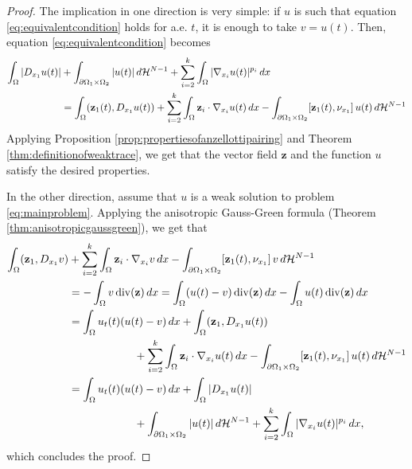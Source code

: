 \documentclass[reqno,12pt]{amsart}
\def\z{{\bf z}}
\numberwithin{equation}{section}
\begin{document}
\begin{proof}
The implication in one direction is very simple: if $u$ is such that equation \eqref{eq:equivalentcondition} holds for a.e. $t$, it is enough to take $v = u(t)$. Then, equation \eqref{eq:equivalentcondition} becomes
\begin{align}
\int_\Omega |D_{x_1} u(t)| &+ \int_{\partial\Omega_1 \times \Omega_2} |u(t)| \, d\mathcal{H}^{N-1} + \sum_{i = 2}^k \int_{\Omega} |\nabla_{x_i} u(t)|^{p_i} \, dx \\
&= \int_\Omega (\z_1(t), D_{x_1} u(t)) + \sum_{i=2}^k \int_\Omega \z_i \cdot \nabla_{x_i} u(t) \, dx - \int_{\partial\Omega_1 \times \Omega_2} [\z_1(t), \nu_{x_1}] \, u(t) \, d\mathcal{H}^{N-1}
\end{align}
Applying Proposition \ref{prop:propertiesofanzellottipairing} and Theorem \ref{thm:definitionofweaktrace}, we get that the vector field $\mathbf{z}$ and the function $u$ satisfy the desired properties.

In the other direction, assume that $u$ is a weak solution to problem \eqref{eq:mainproblem}. Applying the anisotropic Gauss-Green formula (Theorem \ref{thm:anisotropicgaussgreen}), we get that
\begin{align}
\int_\Omega (\z_1, D_{x_1} v) &+ \sum_{i=2}^k \int_\Omega \z_i \cdot \nabla_{x_i} v \, dx - \int_{\partial\Omega_1 \times \Omega_2} [\z_1(t), \nu_{x_1}] \, v \, d\mathcal{H}^{N-1} \\
&= - \int_\Omega v \, \mathrm{div}(\z) \, dx = \int_\Omega (u(t) - v) \, \mathrm{div}(\z) \, dx - \int_\Omega u(t) \, \mathrm{div}(\z) \, dx \\
&= \int_\Omega u_t(t) (u(t) - v) \, dx + \int_\Omega (\z_1, D_{x_1} u(t))  \\
&\qquad\qquad\qquad + \sum_{i=2}^k \int_\Omega \z_i \cdot \nabla_{x_i} u(t) \, dx - \int_{\partial\Omega_1 \times \Omega_2} [\z_1(t), \nu_{x_1}] \, u(t) \, d\mathcal{H}^{N-1} \\
&= \int_\Omega u_t(t) (u(t) - v) \, dx + \int_\Omega |D_{x_1} u(t)| \\
&\qquad\qquad\qquad + \int_{\partial\Omega_1 \times \Omega_2} |u(t)| \, d\mathcal{H}^{N-1} + \sum_{i = 2}^k \int_{\Omega} |\nabla_{x_i} u(t)|^{p_i} \, dx,
\end{align}
which concludes the proof.
\end{proof}
\end{document}

